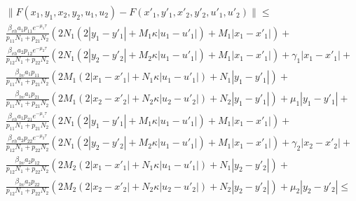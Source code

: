 \begin{align*}
  &\|F(x_1, y_1, x_2, y_2, u_1, u_2) - F(x'_1, y'_1, x'_2, y'_2, u'_1, u'_2)\| \leq \\
  &\frac{\beta_{vh} a_1 p_{11} e^{-\mu_1 \tau}}{p_{11} N_1 + p_{21} N_2} (2 N_1 (2|y_1 - y'_1| + M_1 \kappa |u_1 - u'_1|) + M_1 |x_1 - x'_1|) + \\
  &\frac{\beta_{vh} a_2 p_{12} e^{-\mu_2 \tau}}{p_{12} N_1 + p_{22} N_2}(2 N_1 (2|y_2 - y'_2| + M_2 \kappa |u_1 - u'_1|) + M_1 |x_1 - x'_1|) + \gamma_1 |x_1-x'_1| + \\
  &\frac{\beta_{hv} a_1 p_{11}}{p_{11} N_1 + p_{21} N_2} (2 M_1 (2|x_1 - x'_1| + N_1 \kappa |u_1 - u'_1|) + N_1 |y_1 - y'_1|) + \\
  &\frac{\beta_{hv} a_1 p_{21}}{p_{11} N_1 + p_{21} N_2} (2 M_1 (2|x_2 - x'_2| + N_2 \kappa |u_2 - u'_2|) + N_2 |y_1 - y'_1|) + \mu_1 |y_1 - y'_1| + \\
  &\frac{\beta_{vh} a_1 p_{21} e^{-\mu_1 \tau}}{p_{11} N_1 + p_{21} N_2} (2 N_1 (2|y_1 - y'_1| + M_1 \kappa |u_1 - u'_1|) + M_1 |x_1 - x'_1|) + \\
  &\frac{\beta_{vh} a_2 p_{22} e^{-\mu_2 \tau}}{p_{12} N_1 + p_{22} N_2}(2 N_1 (2|y_2 - y'_2| + M_2 \kappa |u_1 - u'_1|) + M_1 |x_1 - x'_1|) + \gamma_2 |x_2-x'_2| + \\
  &\frac{\beta_{hv} a_2 p_{12}}{p_{12} N_1 + p_{22} N_2} (2 M_2 (2|x_1 - x'_1| + N_1 \kappa |u_1 - u'_1|) + N_1 |y_2 - y'_2|) + \\
  &\frac{\beta_{hv} a_2 p_{22}}{p_{12} N_1 + p_{22} N_2} (2 M_2 (2|x_2 - x'_2| + N_2 \kappa |u_2 - u'_2|) + N_2 |y_2 - y'_2|) + \mu_2 |y_2 - y'_2| \leq
\end{align*}
